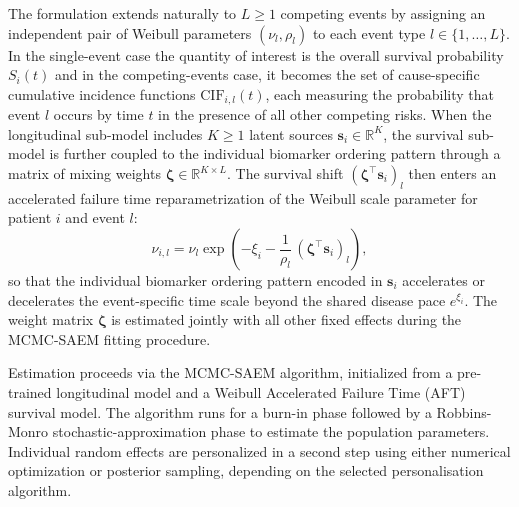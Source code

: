 \documentclass{rapportCS}
\begin{document}
The formulation extends naturally to $L \geq 1$ competing events by assigning an independent pair of Weibull parameters $(\nu_l, \rho_l)$ to each event type $l \in \{1, \ldots, L\}$. In the single-event case the quantity of interest is the overall survival probability $S_i(t)$ and in the competing-events case, it becomes the set of cause-specific cumulative incidence functions $\mathrm{CIF}_{i,l}(t)$, each measuring the probability that event $l$ occurs by time $t$ in the presence of all other competing risks. When the longitudinal sub-model includes $K \geq 1$ latent sources $\mathbf{s}_i \in \mathbb{R}^K$, the survival sub-model is further coupled to the individual biomarker ordering pattern through a matrix of mixing weights $\boldsymbol{\zeta} \in \mathbb{R}^{K \times L}$. The survival shift $(\boldsymbol{\zeta}^\top \mathbf{s}_i)_l$ then enters an accelerated failure time reparametrization of the Weibull scale parameter for patient $i$ and event $l$:
\begin{equation}
  \nu_{i,l} = \nu_l \exp\!\left(-\xi_i - \frac{1}{\rho_l}\,(\boldsymbol{\zeta}^\top \mathbf{s}_i)_l\right),
  \label{eq:nu-rep}
\end{equation}
so that the individual biomarker ordering pattern encoded in $\mathbf{s}_i$ accelerates or decelerates the event-specific time scale beyond the shared disease pace $e^{\xi_i}$. The weight matrix $\boldsymbol{\zeta}$ is estimated jointly with all other fixed effects during the MCMC-SAEM fitting procedure.

Estimation proceeds via the MCMC-SAEM algorithm, initialized from a pre-trained longitudinal model and a Weibull Accelerated Failure Time (AFT) survival model. The algorithm runs for a burn-in phase followed by a Robbins-Monro stochastic-approximation phase to estimate the population parameters. Individual random effects are personalized in a second step using either numerical optimization or posterior sampling, depending on the selected personalisation algorithm.

\end{document}
